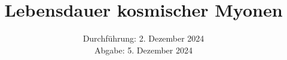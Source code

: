 

\subject{\texorpdfstring{\vspace{2ex}}{}V01\texorpdfstring{\vspace{-2ex}}{}} %
\title{Lebensdauer kosmischer Myonen} %
\date{
	Durchführung: 2. Dezember 2024 %
	\\ Abgabe: 5. Dezember 2024 %
}





\maketitle
\thispagestyle{empty}

\tableofcontents
\newpage








\printbibliography{}

\newpage




